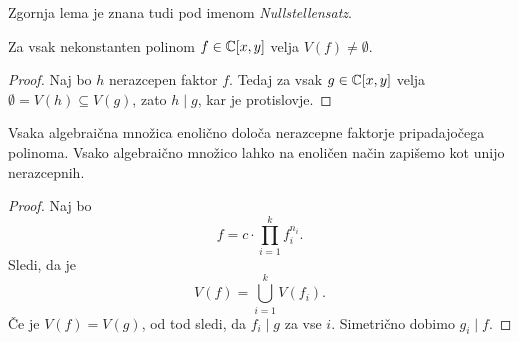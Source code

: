 \begin{opomba}
Zgornja lema je znana tudi pod imenom \emph{Nullstellensatz}.
\end{opomba}

\begin{posledica}
Za vsak nekonstanten polinom $f \in \mathbb{C}[x,y]$ velja
$V(f) \ne \emptyset$.
\end{posledica}

\begin{proof}
Naj bo $h$ nerazcepen faktor $f$. Tedaj za vsak $g \in \mathbb{C}[x,y]$
velja $\emptyset = V(h) \subseteq V(g)$, zato $h \mid g$, kar je
protislovje.
\end{proof}

\begin{posledica}
Vsaka algebraična množica enolično določa nerazcepne faktorje
pripadajočega polinoma. Vsako algebraično množico lahko na enoličen
način zapišemo kot unijo nerazcepnih.
\end{posledica}

\begin{proof}
Naj bo
\[
f = c \cdot \prod_{i=1}^k f_i^{n_i}.
\]
Sledi, da je
\[
V(f) = \bigcup_{i=1}^k V(f_i).
\]
Če je $V(f) = V(g)$, od tod sledi, da $f_i \mid g$ za vse $i$.
Simetrično dobimo $g_i \mid f$.
\end{proof}
